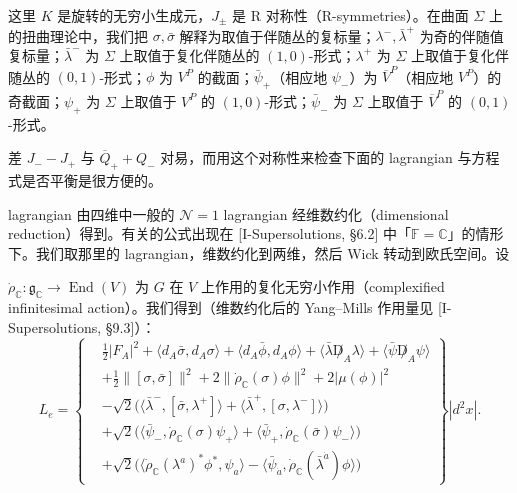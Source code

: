 这里 $K$ 是旋转的无穷小生成元，$J_\pm$ 是 R 对称性（R-symmetries）。在曲面 $\Sigma$ 上的扭曲理论中，我们把 $\sigma,\bar\sigma$ 解释为取值于伴随丛的复标量；$\lambda^-,\bar\lambda^+$ 为奇的伴随值复标量；$\bar\lambda^-$ 为 $\Sigma$ 上取值于复化伴随丛的 $(1,0)$-形式；$\lambda^+$ 为 $\Sigma$ 上取值于复化伴随丛的 $(0,1)$-形式；$\phi$ 为 $V^P$ 的截面；$\bar\psi_+$（相应地 $\psi_-$）为 $\overline{V}^P$（相应地 $V^P$）的奇截面；$\psi_+$ 为 $\Sigma$ 上取值于 $V^P$ 的 $(1,0)$-形式；$\bar\psi_-$ 为 $\Sigma$ 上取值于 $\overline{V}^P$ 的 $(0,1)$-形式。


差 $J_--J_+$ 与 $\overline{Q}_++Q_-$ 对易，而用这个对称性来检查下面的 lagrangian 与方程式是否平衡是很方便的。

lagrangian 由四维中一般的 $\mathcal{N}=1$ lagrangian 经维数约化（dimensional reduction）得到。有关的公式出现在 [I-Supersolutions, §6.2] 中「$\mathbb{F}=\mathbb{C}$」的情形下。我们取那里的 lagrangian，维数约化到两维，然后 Wick 转动到欧氏空间。设



$\dot\rho_{\mathbb{C}}:\mathfrak{g}_{\mathbb{C}}\to\operatorname{End}(V)$ 为 $G$ 在 $V$ 上作用的复化无穷小作用（complexified infinitesimal action）。我们得到（维数约化后的 Yang–Mills 作用量见 [I-Supersolutions, §9.3]）：
\begin{equation}
  \tag{11.6}
  \label{eq:sol11-6}
  L_e=\left\{\begin{aligned}
    &\tfrac12|F_A|^2+\langle d_A\bar\sigma,d_A\sigma\rangle+\langle d_A\bar\phi,d_A\phi\rangle
      +\langle\bar\lambda\not D_A\lambda\rangle+\langle\bar\psi\not D_A\psi\rangle\\
    &+\tfrac12\|[\sigma,\bar\sigma]\|^2+2\|\dot\rho_{\mathbb{C}}(\sigma)\phi\|^2+2|\mu(\phi)|^2\\
    &-\sqrt2\bigl(\langle\bar\lambda^-,[\bar\sigma,\lambda^+]\rangle
      +\langle\bar\lambda^+,[\sigma,\lambda^-]\rangle\bigr)\\
    &+\sqrt2\bigl(\langle\bar\psi_-,\dot\rho_{\mathbb{C}}(\sigma)\psi_+\rangle
      +\langle\bar\psi_+,\dot\rho_{\mathbb{C}}(\bar\sigma)\psi_-\rangle\bigr)\\
    &+\sqrt2\bigl(\langle\dot\rho_{\mathbb{C}}(\lambda^a)^*\phi^*,\psi_a\rangle
      -\langle\bar\psi_{\dot a},\dot\rho_{\mathbb{C}}(\bar\lambda^{\dot a})\phi\rangle\bigr)
  \end{aligned}\right\}|d^2x|.
\end{equation}

